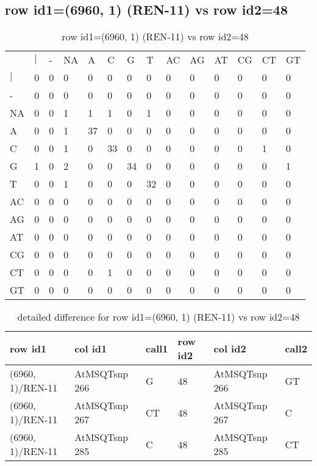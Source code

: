 \subsection{row id1=(6960, 1) (REN-11) vs row id2=48}
\begin{center}
\begin{longtable}{|l|l|l|l|l|l|l|l|l|l|l|l|l|l|}
\caption{row id1=(6960, 1) (REN-11) vs row id2=48} \label{table_dm164}\\
\hline
\\
\hline
&$|$&-&NA&A&C&G&T&AC&AG&AT&CG&CT&GT\\
$|$&0&0&0&0&0&0&0&0&0&0&0&0&0\\
-&0&0&0&0&0&0&0&0&0&0&0&0&0\\
NA&0&0&1&1&1&0&1&0&0&0&0&0&0\\
A&0&0&1&37&0&0&0&0&0&0&0&0&0\\
C&0&0&1&0&33&0&0&0&0&0&0&1&0\\
G&1&0&2&0&0&34&0&0&0&0&0&0&1\\
T&0&0&1&0&0&0&32&0&0&0&0&0&0\\
AC&0&0&0&0&0&0&0&0&0&0&0&0&0\\
AG&0&0&0&0&0&0&0&0&0&0&0&0&0\\
AT&0&0&0&0&0&0&0&0&0&0&0&0&0\\
CG&0&0&0&0&0&0&0&0&0&0&0&0&0\\
CT&0&0&0&0&1&0&0&0&0&0&0&0&0\\
GT&0&0&0&0&0&0&0&0&0&0&0&0&0\\
\hline
\end{longtable}
\end{center}

\begin{center}
\begin{longtable}{|l|l|l|l|l|l|}
\caption{detailed difference for row id1=(6960, 1) (REN-11) vs row id2=48} \label{table_dm165}\\
\hline
row id1&col id1&call1&row id2&col id2&call2\\
\hline
(6960, 1)/REN-11&AtMSQTsnp 266&G&48&AtMSQTsnp 266&GT\\
(6960, 1)/REN-11&AtMSQTsnp 267&CT&48&AtMSQTsnp 267&C\\
(6960, 1)/REN-11&AtMSQTsnp 285&C&48&AtMSQTsnp 285&CT\\
\hline
\end{longtable}
\end{center}

